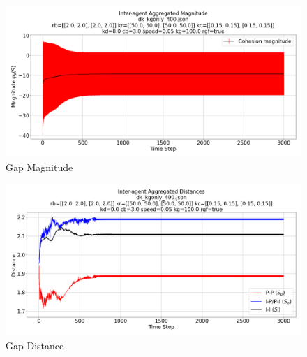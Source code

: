 \documentclass[12pt,a4paper]{IEEEtran}
\begin{document}
\begin{figure}[H]
	\begin{center}
		\includegraphics[width=1.0\linewidth]{figures/gapMagnitude}
	\end{center}
	\caption{Gap Magnitude\label{fig:gapMagnitude}}
\end{figure}

\begin{figure}[H]
	\begin{center}
		\includegraphics[width=1.0\linewidth]{figures/gapDistance}
	\end{center}
	\caption{Gap Distance\label{fig:gapDistance}}
\end{figure}

\end{document}
